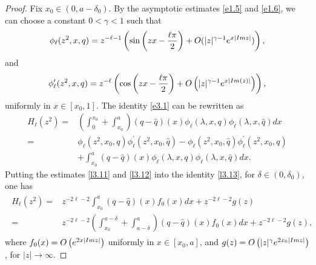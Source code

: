 \documentclass[10pt,a4paper]{amsart}
\begin{document}
\begin{proof}
Fix $x_0\in(0, a-\delta_0)$.
By the asymptotic estimates \eqref{e1.5} and \eqref{e1.6}, we can choose a constant $0<\gamma<1$ such that 
\begin{equation}\label{l3.11}
\phi_{\ell}(z^2, x, q)
=z^{-\ell-1}\left(\sin \left(z x-\frac{\ell\pi}{2}\right)
+O(|z|^{\gamma-1}e^{x|\textnormal{Im}z|})\right),
\end{equation}
and
\begin{equation}\label{l3.12}
\phi_{\ell}^{\prime}(z^2, x, q)
=z^{-\ell}
\left(\cos \left(zx-\frac{\ell \pi}{2}\right)+O\left(|z|^{\gamma-1} e^{x|\textnormal{Im}(z)|}\right)\right),
\end{equation}
uniformly in $x\in[x_0,1]$. The identity \eqref{e3.1} can be rewritten as
\begin{equation}\label{l3.13}
\begin{split}
H_{\ell}(z^2)=&\left(\int_{0}^{x_0}+\int_{x_0}^{a}\right)(q-\hat{q})(x)\phi_{\ell}(\lambda, x, q) \phi_{\ell}(\lambda, x, \hat{q})dx\\
=&\phi_{\ell}(z^2,x_0,q)\phi_{\ell}^{\prime}(z^2,x_0,\hat{q})-\phi_{\ell}(z^2,x_0,\hat{q})\phi_{\ell}^{\prime}(z^2,x_0,q)\\
&+\int_{x_0}^{a}(q-\hat{q})(x)\phi_{\ell}(\lambda, x, q) \phi_{\ell}(\lambda, x, \hat{q})dx.
\end{split}
\end{equation}
Putting the estimates \eqref{l3.11} and \eqref{l3.12} into the identity \eqref{l3.13}, for $\delta\in(0,\delta_{0})$, one has
\begin{align}\label{e3.3}
\begin{split}
H_{\ell}(z^2)= &z^{-2 \ell-2}\int_{x_0}^{a}(q-\hat{q})(x)f_0(x)dx+z^{-2\ell-2}g(z)\\
= &z^{-2 \ell-2}\left(\int_{x_0}^{a-\delta}+\int_{a-\delta}^{a}\right)
(q-\hat{q})(x)f_0(x)dx+z^{-2\ell-2}g(z),
\end{split}
\end{align}
where $f_0(x)=O\left(e^{2x|\textnormal{Im}z|}\right)$ uniformly in $x\in[x_0,a]$, and $g(z)=O\left(|z|^{\gamma}e^{2x_0|\textnormal{Im}z|}\right)$, 
for $|z|\rightarrow\infty$. 


\end{proof}
\end{document}
